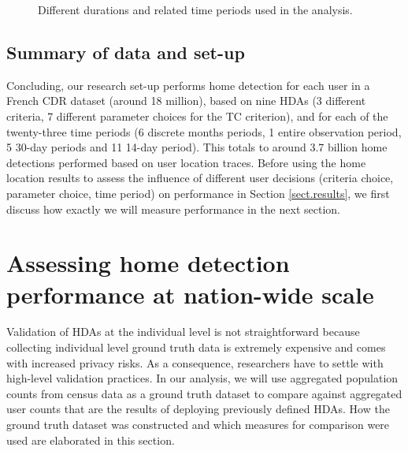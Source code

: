 \documentclass[a4paper]{article}
\begin{document}
\begin{figure}[htpb!]
\centering
\caption{Different durations and related time periods used in the analysis.}
\label{fig:time_periods}
\end{figure}

\subsection{Summary of data and set-up}
Concluding, our research set-up performs home detection for each user in a French CDR dataset (around 18 million), based on nine HDAs (3 different criteria, 7 different parameter choices for the TC criterion), and for each of the twenty-three time periods (6 discrete months periods, 1 entire observation period, 5 30-day periods and 11 14-day period). This totals to around 3.7 billion home detections performed based on user location traces. Before using the home location results to assess the influence of different user decisions (criteria choice, parameter choice, time period) on performance in Section \ref{sect.results}, we first discuss how exactly we will measure performance in the next section.


\section{Assessing home detection performance at nation-wide scale}

Validation of HDAs at the individual level is not straightforward because collecting individual level ground truth data is extremely expensive and comes with increased privacy risks. As a consequence, researchers have to settle with high-level validation practices. In our analysis, we will use aggregated population counts from census data as a ground truth dataset to compare against aggregated user counts that are the results of deploying previously defined HDAs. How the ground truth dataset was constructed and which measures for comparison were used are elaborated in this section.  
\end{document}
